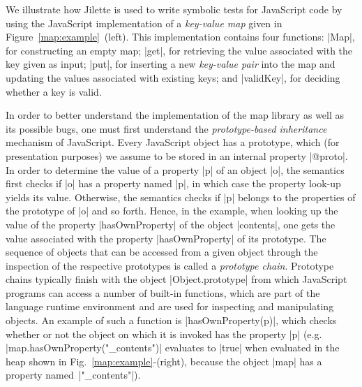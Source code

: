 

We illustrate how Jilette is used to write symbolic tests for JavaScript code by using the JavaScript implementation 
of a  \emph{key-value map} given in Figure~\ref{map:example}~(left). 
This implementation contains four functions: 
\jsinline|Map|, for constructing an empty map;
\jsinline|get|, for retrieving the value associated with the key given as input;
\jsinline|put|, for inserting a new \emph{key-value pair} into the map and updating the values associated with existing keys; and
\jsinline|validKey|, for deciding whether a key is valid.

In order to better understand the implementation of the map library as well as its possible bugs, 
one must first understand the \emph{prototype-based inheritance} mechanism of JavaScript. 
Every JavaScript object has a prototype, which (for presentation purposes) we assume to 
be stored  in an internal property \jsinline|@proto|. In order to determine the value of a property
\jsinline|p| of an object \jsinline|o|, the semantics first checks if \jsinline|o| has a 
property named \jsinline|p|, in which case the property look-up yields its value. Otherwise, the 
semantics checks if \jsinline|p| belongs to the properties of the prototype of \jsinline|o| and so 
forth. Hence, in the example, when looking up the value of the property \jsinline|hasOwnProperty|
of the object \jsinline|contents|, one gets the value associated with the property  \jsinline|hasOwnProperty|
of its prototype.
The sequence of objects that can be accessed from a given object through the inspection 
of the respective prototypes is called a \emph{prototype chain}.
Prototype chains typically finish with the object \jsinline|Object.prototype| from which JavaScript 
programs can access a number of built-in functions, which are part of the language runtime environment and are used for inspecting and manipulating objects.
An example of such a function is \jsinline|hasOwnProperty(p)|, which checks whether or not the object 
on which it is invoked has the property \jsinline|p| (e.g. {\small \jsinline|map.hasOwnProperty("_contents")|}
evaluates to \jsinline|true| when evaluated in the heap shown in Fig.~\ref{map:example}-(right), 
because the object \jsinline|map| has a property named~\jsinline|"_contents"|). 

